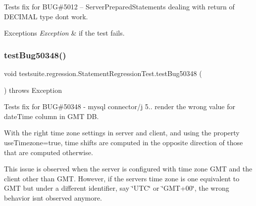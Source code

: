 Tests fix for B\+UG\#5012 -- Server\+Prepared\+Statements dealing with return of D\+E\+C\+I\+M\+AL type don\textquotesingle{}t work.


\begin{DoxyExceptions}{Exceptions}
{\em Exception} & if the test fails. \\
\hline
\end{DoxyExceptions}
\mbox{\label{classtestsuite_1_1regression_1_1_statement_regression_test_a2b6b5d2943bee507e1d7495e883ae9c5}} 
\subsubsection{\texorpdfstring{test\+Bug50348()}{testBug50348()}}
{\footnotesize\ttfamily void testsuite.\+regression.\+Statement\+Regression\+Test.\+test\+Bug50348 (\begin{DoxyParamCaption}{ }\end{DoxyParamCaption}) throws Exception}

Tests fix for B\+UG\#50348 -\/ mysql connector/j 5.. render the wrong value for date\+Time column in G\+MT DB.

With the right time zone settings in server and client, and using the property \textquotesingle{}use\+Timezone=true\textquotesingle{}, time shifts are computed in the opposite direction of those that are computed otherwise.

This issue is observed when the server is configured with time zone \textquotesingle{}G\+MT\textquotesingle{} and the client other than \textquotesingle{}G\+MT\textquotesingle{}. However, if the server\textquotesingle{}s time zone is one equivalent to \textquotesingle{}G\+MT\textquotesingle{} but under a different identifier, say \char`\"{}\+U\+T\+C\char`\"{} or \char`\"{}\+G\+M\+T+00\char`\"{}, the wrong behavior isn\textquotesingle{}t observed anymore. \mbox{\label{classtestsuite_1_1regression_1_1_statement_regression_test_aebe0b100ad408b0b92fc1c55d590e08e}} 

